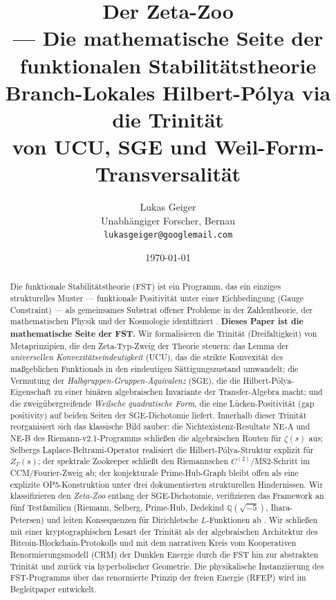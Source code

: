 \documentclass[11pt]{article}
\title{Der Zeta-Zoo\\
  \large --- Die mathematische Seite der\\
  funktionalen Stabilitätstheorie\\[0.3em]
  \normalsize Branch-Lokales Hilbert-P\'olya via die Trinität\\
  von UCU, SGE und Weil-Form-Transversalität}
\author{Lukas Geiger\\
  \small Unabhängiger Forscher, Bernau\\
  \small \texttt{lukasgeiger@googlemail.com}}
\date{\today}
\theoremstyle{definition}
\theoremstyle{remark}
\begin{document}
\maketitle

\begin{abstract}
\noindent
Die funktionale Stabilitätstheorie (FST) ist ein Programm, das ein
einziges strukturelles Muster --- funktionale Positivität unter einer
Eichbedingung (Gauge Constraint) --- als gemeinsames Substrat offener Probleme in
der Zahlentheorie, der mathematischen Physik und der Kosmologie identifiziert \cite{RFEPFramework}.
\textbf{Dieses Paper ist die mathematische Seite der FST.} Wir formalisieren
die Trinität (Dreifaltigkeit) von Metaprinzipien, die den Zeta-Typ-Zweig der
Theorie steuern: das Lemma der \emph{universellen Konvexitätseindeutigkeit} (UCU),
das die strikte Konvexität des maßgeblichen Funktionals in den
eindeutigen Sättigungszustand umwandelt; die Vermutung der
\emph{Halbgruppen-Gruppen-Äquivalenz} (SGE), die die Hilbert-P\'olya-Eigenschaft
zu einer binären algebraischen Invariante der Transfer-Algebra macht;
und die zweigübergreifende \emph{Weilsche quadratische Form}, die eine
Lücken-Positivität (gap positivity) auf beiden Seiten der SGE-Dichotomie
liefert. Innerhalb dieser Trinität reorganisiert sich das klassische Bild
sauber: die Nichtexistenz-Resultate NE-A und NE-B des Riemann-v2.1-Programms
\cite{Geiger2026RHII} schließen die algebraischen Routen für $\zeta(s)$ aus;
Selbergs Laplace-Beltrami-Operator realisiert die Hilbert-P\'olya-Struktur
explizit für $Z_\Gamma(s)$; der spektrale Zookeeper \cite{Zookeeper2026}
schließt den Riemannschen $C^{(2)}$/MS2-Schritt im CCM/Fourier-Zweig ab; der
konjekturale Prime-Hub-Graph bleibt offen als eine explizite OP5-Konstruktion
unter drei dokumentierten strukturellen Hindernissen.
Wir klassifizieren den \emph{Zeta-Zoo} entlang der SGE-Dichotomie, verifizieren das
Framework an fünf Testfamilien (Riemann, Selberg, Prime-Hub,
Dedekind $\mathbb{Q}(\sqrt{-5})$, Ihara-Petersen) und leiten
Konsequenzen für Dirichletsche $L$-Funktionen ab \cite{PaleyWienerDirichlet, DirichletAtlas}.
Wir schließen mit einer kryptographischen Lesart der Trinität als der algebraischen
Architektur des Bitcoin-Blockchain-Protokolls und mit dem narrativen Kreis
vom Kooperativen Renormierungsmodell (CRM) der Dunklen Energie durch die FST
hin zur abstrakten Trinität und zurück via hyperbolischer Geometrie. Die physikalische
Instanziierung des FST-Programms über das renormierte Prinzip der freien Energie (RFEP)
wird im Begleitpaper \cite{RFEPFramework} entwickelt.
\end{abstract}
\end{document}
